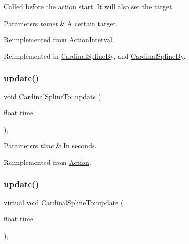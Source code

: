 Called before the action start. It will also set the target.


\begin{DoxyParams}{Parameters}
{\em target} & A certain target. \\
\hline
\end{DoxyParams}


Reimplemented from \hyperlink{classActionInterval_ad3d91186b2c3108488ddbbdbbd982484}{Action\+Interval}.



Reimplemented in \hyperlink{classCardinalSplineBy_a913fc62fee3b78dcdeb76b9bf8d05b35}{Cardinal\+Spline\+By}, and \hyperlink{classCardinalSplineBy_aaf4bff6ebce3d2ccf6dfaa71678d4462}{Cardinal\+Spline\+By}.

\mbox{\label{classCardinalSplineTo_ae59f479c5041896e373bdcc8af9cdd30}} 
\subsubsection{\texorpdfstring{update()}{update()}\hspace{0.1cm}{\footnotesize\ttfamily [1/2]}}
{\footnotesize\ttfamily void Cardinal\+Spline\+To\+::update (\begin{DoxyParamCaption}\item[{float}]{time }\end{DoxyParamCaption})\hspace{0.3cm}{\ttfamily [override]}, {\ttfamily [virtual]}}


\begin{DoxyParams}{Parameters}
{\em time} & In seconds. \\
\hline
\end{DoxyParams}


Reimplemented from \hyperlink{classAction_a937e646e63915e33ad05ba149bfcf239}{Action}.

\mbox{\label{classCardinalSplineTo_a8bad76ed354e2a5ef225e25f39e51184}} 
\subsubsection{\texorpdfstring{update()}{update()}\hspace{0.1cm}{\footnotesize\ttfamily [2/2]}}
{\footnotesize\ttfamily virtual void Cardinal\+Spline\+To\+::update (\begin{DoxyParamCaption}\item[{float}]{time }\end{DoxyParamCaption})\hspace{0.3cm}{\ttfamily [override]}, {\ttfamily [virtual]}}


